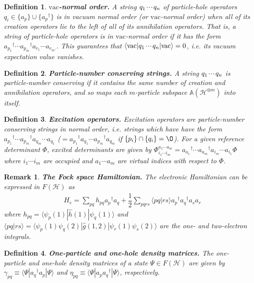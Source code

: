 \documentclass[11pt,fleqn]{article}
\newcommand{\g}{\gamma}      %
\newcommand{\h}{\eta}        %
\newcommand{\F}{\Phi}        %
\newcommand{\y}{\psi}        %
\newcommand{\Y}{\Psi}        %
\newcommand{\dg}{\ensuremath{^\dagger}}
\newcommand{\op}[1]{\ensuremath{\hat{#1}}}
\newcommand{\vac}{\ensuremath{\mathrm{vac}}}
\newcommand{\cd}{\ensuremath{\cdots}}
\newcommand{\etc}{\ensuremath{\mathinner{\mkern-1mu\cdotp\mkern-2mu\cdotp\mkern-2mu\cdotp\mkern-1mu}}}
\newcommand{\bmit}[1]{{\bfseries\itshape\mathversion{bold}#1}}
\newcommand{\mc}[1]{\ensuremath{\mathcal{#1}}}
\newcommand{\mb}[1]{\ensuremath{\mathbb{#1}}}
\newcommand{\fr}[2]{\ensuremath{\dfrac{#1}{#2}}}
\newcommand{\ip}[1]{\ensuremath{\langle#1\rangle}}
\theoremstyle{mystyle}
\newtheorem{dfn}{Definition}[section]
\newtheorem{rmk}{Remark}[section]
\numberwithin{equation}{section}
\begin{document}
\begin{dfn}
\label{normal-order}
\bmit{$\vac$-normal order.}
A string $q_1\etc q_n$ of particle-hole operators $q_i\in \{a_p\}\cup\{a_p\dg\}$ is in \textit{vacuum normal order} (or \textit{$\vac$-normal order}) when all of its creation operators lie to the left of all of its annihilation operators.
That is, a string of particle-hole operators is in $\vac$-normal order if it has the form $a_{p_1}\dg\cd a_{p_m}\dg a_{r_1}\cd a_{r_{m'}}$.
This guarantees that $\ip{\vac|q_1\etc q_n|\vac}=0$, i.e. its vacuum expectation value vanishes.
\end{dfn}

\begin{dfn}
\label{particle-number-conserving-operators}
\bmit{Particle-number conserving strings.}
A string $q_1\etc q_n$ is \textit{particle-number conserving} if it contains the same number of creation and annihilation operators, and so maps each $m$-particle subspace $\mb{A}(\mc{H}^{\otimes m})$ into itself.
\end{dfn}

\begin{dfn}
\bmit{Excitation operators.}
Excitation operators are particle-number conserving strings in normal order, i.e. strings which have have the form $a_{p_1}\dg\cd a_{p_m}\dg a_{q_m}\cd a_{q_1}$ ($=a_{p_1}\dg a_{q_1}\cd a_{p_m}\dg a_{q_m}$ if $\{p_i\}\cap\{q_i\}=\O$).
For a given reference determinant $\F$, excited determinants are given by $\F_{i_1\cd i_m}^{a_1\cd a_m}=a_{a_1}\dg\cd a_{a_m}\dg a_{i_m}\cd a_{i_1}\F$ where $i_1\cd i_m$ are occupied and $a_1\cd a_m$ are virtual indices with respect to $\F$.
\end{dfn}

\begin{rmk}
\label{fock-space-operators}
\bmit{The Fock space Hamiltonian.}
The electronic Hamiltonian can be expressed in $F(\mc{H})$ as
\begin{align*}
&&
  H_e
=
  \sum_{pq}
  h_{pq} a_p\dg a_q
+
  \fr{1}{2}
  \sum_{pqrs}
  \ip{pq|rs} a_p\dg a_q\dg a_sa_r
\end{align*}
where
$
  h_{pq}
=
  \ip{\y_p(1)|\op{h}(1)|\y_q(1)}
$
and
$
  \ip{pq|rs}
=
  \ip{\y_p(1)\y_q(2)|\op{g}(1,2)|\y_r(1)\y_s(2)}
$
are the one- and two-electron integrals.
\end{rmk}


\begin{dfn}
\bmit{One-particle and one-hole density matrices.}
The \textit{one-particle} and \textit{one-hole density matrices} of a state $\Y\in F(\mc{H})$ are given by $\g_{pq}\equiv\ip{\Y|a_q\dg a_p|\Y}$ and $\h_{pq}\equiv\ip{\Y|a_pa_q\dg|\Y}$, respectively.
\end{dfn}
\end{document}
